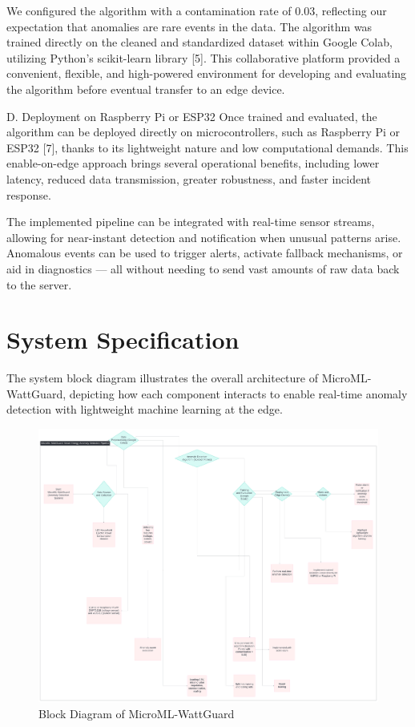 \documentclass[12pt, draftclsnofoot, onecolumn]{IEEEtran}
\begin{document}
We configured the algorithm with a contamination rate of 0.03, reflecting our expectation that anomalies are rare events in the data. The algorithm was trained directly on the cleaned and standardized dataset within Google Colab, utilizing Python’s scikit-learn library [5]. This collaborative platform provided a convenient, flexible, and high-powered environment for developing and evaluating the algorithm before eventual transfer to an edge device.

D. Deployment on Raspberry Pi or ESP32
Once trained and evaluated, the algorithm can be deployed directly on microcontrollers, such as Raspberry Pi or ESP32 [7], thanks to its lightweight nature and low computational demands. This enable-on-edge approach brings several operational benefits, including lower latency, reduced data transmission, greater robustness, and faster incident response.

The implemented pipeline can be integrated with real-time sensor streams, allowing for near-instant detection and notification when unusual patterns arise. Anomalous events can be used to trigger alerts, activate fallback mechanisms, or aid in diagnostics — all without needing to send vast amounts of raw data back to the server.

\section{System Specification}
The system block diagram illustrates the overall architecture of MicroML-WattGuard, depicting how each component interacts to enable real-time anomaly detection with lightweight machine learning at the edge.

\begin{figure}[h!]
	\centering
	\includegraphics[width=1\textwidth]{block_diagram.png}
	\caption{Block Diagram of MicroML-WattGuard}
	\label{fig:blockdiagram}
\end{figure}
\end{document}
